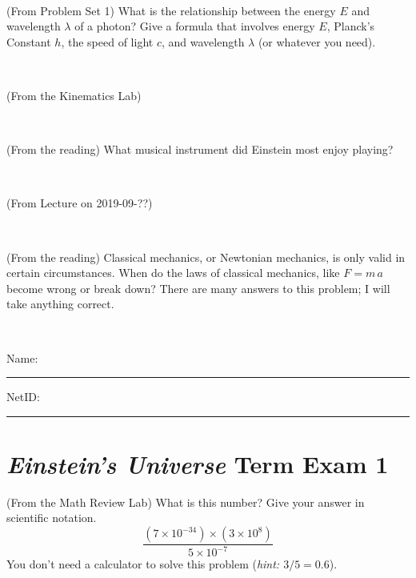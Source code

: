 \documentclass[12pt, letterpaper]{article}
\begin{document}
\vfill ~

\begin{problem} (From Problem Set 1)
What is the relationship between the energy $E$ and wavelength
$\lambda$ of a photon? Give a formula that involves energy $E$,
Planck's Constant $h$, the speed of light $c$, and wavelength
$\lambda$ (or whatever you need).
\end{problem}

\vfill ~


\clearpage


\begin{problem} (From the Kinematics Lab)

\end{problem}


\vfill ~

\begin{problem} (From the reading)
What musical instrument did Einstein most enjoy playing?
\end{problem}


\vfill ~

\begin{problem} (From Lecture on 2019-09-??)
\end{problem}


\vfill ~

\begin{problem} (From the reading)
Classical mechanics, or Newtonian mechanics, is only valid in certain
circumstances. When do the laws of classical mechanics, like $F =
m\,a$ become wrong or break down? There are many answers to this
problem; I will take anything correct.
\end{problem}


\vfill ~


\cleardoublepage



\noindent
Name: \rule[-1ex]{0.60\textwidth}{0.1pt}
NetID: \rule[-1ex]{0.20\textwidth}{0.1pt}

\section*{\textsl{Einstein's Universe} Term Exam 1}
\setcounter{problem}{1}


\begin{problem} (From the Math Review Lab)
What is this number? Give your answer in scientific notation.
$$
\frac{(7\times10^{-34})\times(3\times10^8)}{5\times10^{-7}}
$$
You don't need a calculator to solve this problem (\textit{hint: $3/5=0.6$}).
\end{problem}
\end{document}
